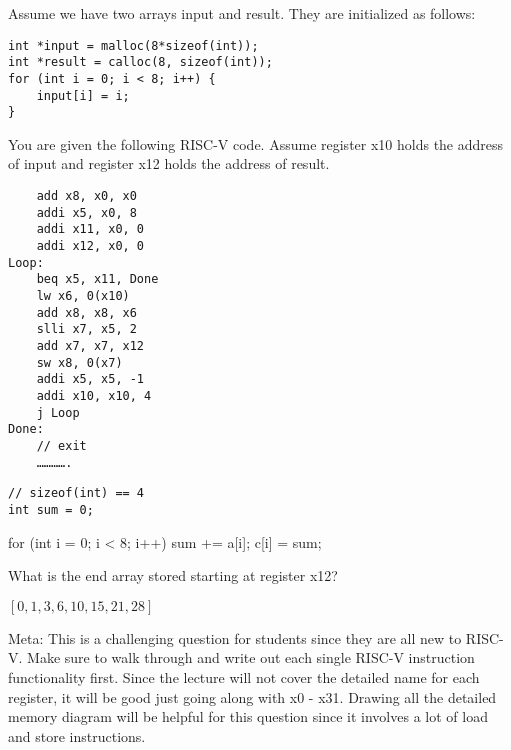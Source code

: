 \begin{blocksection}
\question Assume we have two arrays input and result. They are initialized as follows:

\begin{verbatim}
int *input = malloc(8*sizeof(int));
int *result = calloc(8, sizeof(int));
for (int i = 0; i < 8; i++) {
    input[i] = i;
}
\end{verbatim}

You are given the following RISC-V code. Assume register x10 holds the address of input and register x12 holds the address of result.

\begin{verbatim}
    add x8, x0, x0
    addi x5, x0, 8
    addi x11, x0, 0
    addi x12, x0, 0
Loop:
    beq x5, x11, Done
    lw x6, 0(x10)
    add x8, x8, x6
    slli x7, x5, 2
    add x7, x7, x12
    sw x8, 0(x7)
    addi x5, x5, -1
    addi x10, x10, 4
    j Loop
Done:
    // exit
    ………….
\end{verbatim}

\begin{verbatim}
// sizeof(int) == 4
int sum = 0;
\end{verbatim}
\begin{solution}[0.7in]
for (int i = 0; i < 8; i++) {
    sum += a[i];
    c[i] = sum;
}
\end{solution}

\question What is the end array stored starting at register x12?

\begin{solution}
$[0, 1, 3, 6, 10, 15, 21, 28]$

Meta: This is a challenging question for students since they are all new to RISC-V. Make sure to walk through and write out each single RISC-V instruction functionality first. Since the lecture will not cover the detailed name for each register, it will be good just going along with x0 - x31. Drawing all the detailed memory diagram will be helpful for this question since it involves a lot of load and store instructions. 
\end{solution}
\end{blocksection}